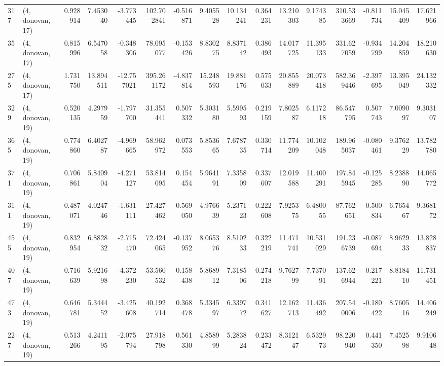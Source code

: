 \begin{tabular}{llrrrrrrrrrrrrrr}
317 &  (4, donovan, 17) &   0.928914 &   7.453040 &  -3.773445 &   102.702841 &  -0.516871 &   9.405528 &  10.134241 &  0.364231 &  13.210303 &   9.174385 &   310.533669 & -0.811734 &  15.045409 &  17.621966 \\
35  &  (4, donovan, 17) &   0.815996 &   6.547058 &  -0.348306 &    78.095077 &  -0.153426 &   8.830275 &   8.837142 &  0.386493 &  14.017725 &  11.395133 &   331.627059 & -0.934799 &  14.204859 &  18.210630 \\
275 &  (4, donovan, 17) &   1.731750 &  13.894511 & -12.757021 &   395.261172 &  -4.837814 &  15.248593 &  19.881176 &  0.575033 &  20.855889 &  20.073418 &   582.369446 & -2.397695 &  13.395049 &  24.132332 \\
329 &  (4, donovan, 19) &   0.520135 &   4.297959 &  -1.797700 &    31.355441 &   0.507332 &   5.303180 &   5.599593 &  0.219159 &   7.802587 &   6.117218 &    86.547795 &  0.507743 &   7.009097 &   9.303107 \\
365 &  (4, donovan, 19) &   0.774860 &   6.402787 &  -4.969665 &    58.962972 &   0.073553 &   5.853665 &   7.678735 &  0.330714 &  11.774209 &  10.102048 &   189.965037 & -0.080461 &   9.376229 &  13.782780 \\
371 &  (4, donovan, 19) &   0.706861 &   5.840904 &  -4.271127 &    53.814095 &   0.154454 &   5.964191 &   7.335809 &  0.337607 &  12.019588 &  11.400291 &   197.845945 & -0.125285 &   8.238890 &  14.065772 \\
311 &  (4, donovan, 19) &   0.487071 &   4.024746 &  -1.631111 &    27.427462 &   0.569050 &   4.976639 &   5.237123 &  0.222608 &   7.925375 &   6.480055 &    87.762651 &  0.500834 &   6.765467 &   9.368172 \\
455 &  (4, donovan, 19) &   0.832954 &   6.882832 &  -2.715470 &    72.424065 &  -0.137952 &   8.065376 &   8.510233 &  0.322219 &  11.471741 &  10.531029 &   191.236739 & -0.087694 &   8.962933 &  13.828837 \\
407 &  (4, donovan, 19) &   0.716639 &   5.921698 &  -4.372230 &    53.560532 &   0.158438 &   5.868912 &   7.318506 &  0.274218 &   9.762799 &   7.737091 &   137.626944 &  0.217221 &   8.818410 &  11.731451 \\
473 &  (4, donovan, 19) &   0.646781 &   5.344452 &  -3.425608 &    40.192714 &   0.368478 &   5.334597 &   6.339772 &  0.341627 &  12.162713 &  11.436492 &   207.540006 & -0.180422 &   8.760516 &  14.406249 \\
227 &  (4, donovan, 19) &   0.513266 &   4.241195 &  -2.075794 &    27.918798 &   0.561330 &   4.858999 &   5.283824 &  0.233472 &   8.312147 &   6.532973 &    98.220940 &  0.441350 &   7.452598 &   9.910648 \\

\end{tabular}
